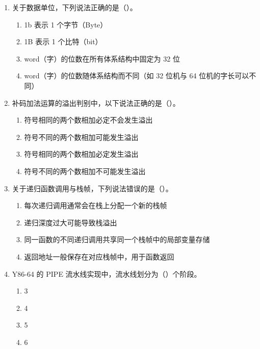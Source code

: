 \documentclass[11pt,a4paper]{ctexart}
\begin{document}
\begin{enumerate}

\item 关于数据单位，下列说法正确的是（\hspace{1.2em}）。
\begin{enumerate}[label=\Alph*.,itemsep=0.1em]
  \item 1b 表示 1 个字节（Byte）
  \item 1B 表示 1 个比特（bit）
  \item word（字）的位数在所有体系结构中固定为 32 位
  \item word（字）的位数随体系结构而不同（如 32 位机与 64 位机的字长可以不同）
\end{enumerate}

\item 补码加法运算的溢出判别中，以下说法正确的是（\hspace{1.2em}）。
\begin{enumerate}[label=\Alph*.,itemsep=0.1em]
  \item 符号相同的两个数相加必定不会发生溢出
  \item 符号不同的两个数相加可能发生溢出
  \item 符号相同的两个数相加必定发生溢出
  \item 符号不同的两个数相加不可能发生溢出
\end{enumerate}

\item 关于递归函数调用与栈帧，下列说法错误的是（\hspace{1.2em}）。
\begin{enumerate}[label=\Alph*.,itemsep=0.1em]
  \item 每次递归调用通常会在栈上分配一个新的栈帧
  \item 递归深度过大可能导致栈溢出
  \item 同一函数的不同递归调用共享同一个栈帧中的局部变量存储
  \item 返回地址一般保存在对应栈帧中，用于函数返回
\end{enumerate}

\item Y86-64 的 PIPE 流水线实现中，流水线划分为（\hspace{1.2em}）个阶段。
\begin{enumerate}[label=\Alph*.,itemsep=0.1em]
  \item 3
  \item 4
  \item 5
  \item 6
\end{enumerate}


\end{enumerate}
\end{document}
